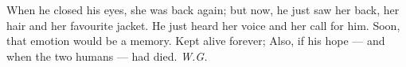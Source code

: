 When he closed his eyes, 
she was back again; 
but now, he just saw her back, 
her hair and her favourite jacket. 
He just heard her voice 
and her call for him. 
Soon, 
that emotion 
would be a memory. 
Kept alive forever; 
Also, if his hope --- 
and when the two humans --- 
had died. 
\emph{W.G.}

